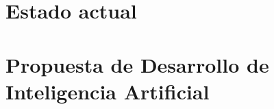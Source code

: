 \documentclass{article}
\begin{document}
%


\newpage
\section{Estado actual}



\newpage
\section{Propuesta de Desarrollo de Inteligencia Artificial}





%
%
\end{document}

